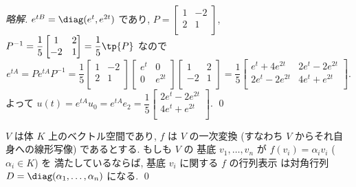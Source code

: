 \documentclass[12pt,twoside]{jarticle}
\newcommand\commentout[1]{#1}
\newcommand\commentout[1]{}
\begin{document}
\commentout{
\begin{proof}[略解]
  $e^{tB}=\diag(e^t,e^{2t})$ であり, 
  $P=
  \begin{bmatrix}
    1 & -2 \\
    2 & 1 \\
  \end{bmatrix}$, $P^{-1}=\dfrac{1}{5}
  \begin{bmatrix}
    1 & 2 \\
    -2 & 1 \\
  \end{bmatrix} = \dfrac{1}{5}\tp{P}$ なので
  \begin{equation*}
    e^{tA} 
    = Pe^{tA}P^{-1}
    = \frac{1}{5}
  \begin{bmatrix}
    1 & -2 \\
    2 & 1 \\
  \end{bmatrix}
  \begin{bmatrix}
    e^t & 0 \\
    0 & e^{2t} \\
  \end{bmatrix}
  \begin{bmatrix}
    1 & 2 \\
    -2 & 1 \\
  \end{bmatrix}
  =
  \frac{1}{5}
  \begin{bmatrix}
    e^t + 4e^{2t}  & 2e^t - 2e^{2t} \\
    2e^t - 2e^{2t} & 4e^t + e^{2t} \\
  \end{bmatrix}.
  \end{equation*}
  よって $u(t) = e^{tA}u_0 = e^{tA}e_2 = \dfrac{1}{5}
  \begin{bmatrix}
    2e^t - 2e^{2t} \\
    4e^t + e^{2t} \\
  \end{bmatrix}$. \qed
\end{proof}
}


\begin{question}[一次変換の対角化, 10点]
  $V$ は体 $K$ 上のベクトル空間であり, $f$ は $V$ の一次変換 (すなわち $V$ 
  からそれ自身への線形写像) であるとする. もしも $V$ の
  基底 $v_1,\ldots,v_n$ が $f(v_i)=\alpha_i v_i$ ($\alpha_i\in K$) を
  満たしているならば, 基底 $v_i$ に関する $f$ の行列表示
  は対角行列 $D=\diag(\alpha_1,\ldots,\alpha_n)$ になる.
  \qed
\end{question}
\end{document}
